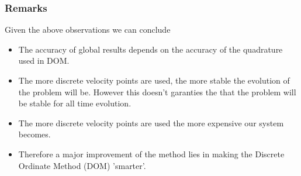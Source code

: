 \begin{frame}
	\frametitle{Remarks}
	Given the above observations we can conclude
	\begin{itemize}
		\item The accuracy of global results depends on the accuracy of the quadrature used in DOM.
		\item The more discrete velocity points are used, the more stable the evolution of the problem will be. However this doesn't garanties the that the problem will be stable for all time evolution.
		\item The more discrete velocity points are used the more expensive our system becomes.
		\item Therefore a major improvement of the method lies in making the Discrete Ordinate Method (DOM) 'smarter'.
	\end{itemize}
	
\end{frame}